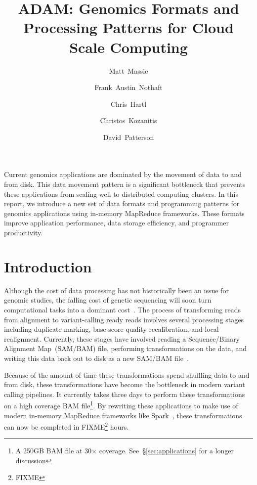 \documentclass[10pt,twocolumn]{article}
\date{}
\begin{document}
\title{ADAM: Genomics Formats and Processing Patterns for Cloud Scale Computing}
\author[1]{Matt~Massie}
\author[1]{Frank~Austin~Nothaft}
\author[1,2]{Chris~Hartl}
\author[1]{Christos~Kozanitis}
\author[1]{David~Patterson}

\maketitle

\raggedbottom

\abstract

Current genomics applications are dominated by the movement of data to and from disk. This data movement pattern
is a significant bottleneck that prevents these applications from scaling well to distributed computing clusters. In this report,
we introduce a new set of data formats and programming patterns for genomics applications using in-memory MapReduce
frameworks. These formats improve application performance, data storage efficiency, and programmer productivity.

\section{Introduction}
\label{sec:introduction}

Although the cost of data processing has not historically been an issue for genomic studies, the falling cost of genetic
sequencing will soon turn computational tasks into a dominant cost~\cite{nhgri}. The process of transforming reads
from alignment to variant-calling ready reads involves several processing stages including duplicate marking, base
score quality recalibration, and local realignment. Currently, these stages have involved reading a Sequence/Binary
Alignment Map~(SAM/BAM) file, performing transformations on the data, and writing this data back out to disk as a
new SAM/BAM file~\cite{li09}.

Because of the amount of time these transformations spend shuffling data to and from disk, these transformations have become
the bottleneck in modern variant calling pipelines. It currently takes three days to perform these transformations on a high
coverage BAM file\footnote{A 250GB BAM file at 30$\times$ coverage. See~\S\ref{sec:applications} for a longer discussion}. By
rewriting these applications to make use of modern in-memory MapReduce frameworks like Spark~\cite{zaharia10}, these
transformations can now be completed in FIXME\footnote{FIXME} hours.
\end{document}
